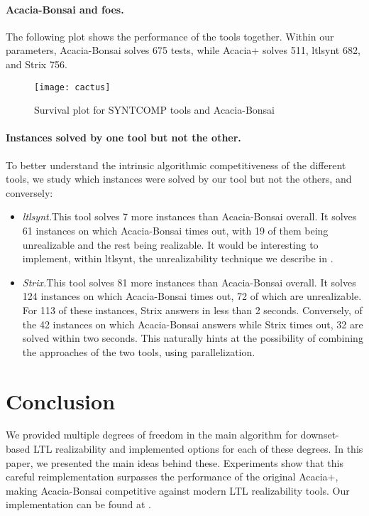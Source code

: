 \documentclass[runningheads,a4paper]{llncs}
\begin{document}
\paragraph{Acacia-Bonsai and foes.}  The following plot shows the performance of
the tools together.  Within our parameters, Acacia-Bonsai solves 675 tests,
while Acacia+ solves 511, ltlsynt 682, and Strix 756.

\begin{figure}[h!]
  \centering
  \texttt{[image: cactus]}
  \caption{Survival plot for SYNTCOMP tools and Acacia-Bonsai}
  \label{fig:cactus}
\end{figure}

\paragraph{Instances solved by one tool but not the other.}  To better
understand the intrinsic algorithmic competitiveness of the different tools, we
study which instances were solved by our tool but not the others, and conversely:
\begin{itemize}
\item \emph{ltlsynt.}\quad This tool solves 7 more instances than Acacia-Bonsai
  overall.  It solves 61 instances on which Acacia-Bonsai times out, with 19 of
  them being unrealizable and the rest being realizable.  It would be
  interesting to implement, within ltlsynt, the unrealizability technique we
  describe in .
\item \emph{Strix.}\quad This tool solves 81 more instances than Acacia-Bonsai
  overall.  It solves 124 instances on which Acacia-Bonsai times out, 72 of
  which are unrealizable.  For 113 of these instances, Strix answers in less
  than 2 seconds.  Conversely, of the 42 instances on which Acacia-Bonsai
  answers while Strix times out, 32 are solved within two seconds.  This
  naturally hints at the possibility of combining the approaches of the two
  tools, using parallelization.
\end{itemize}

\section{Conclusion}

We provided multiple degrees of freedom in the main algorithm for downset-based
LTL realizability and implemented options for each of these degrees.  In this
paper, we presented the main ideas behind these.  Experiments show that this
careful reimplementation surpasses the performance of the original Acacia+,
making Acacia-Bonsai competitive against modern LTL realizability tools. Our
implementation can be found at
.
\end{document}
